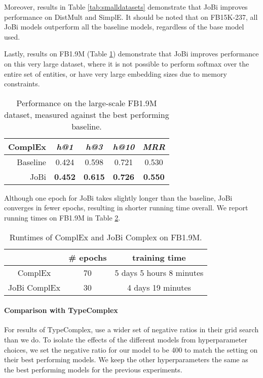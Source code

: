 \documentclass[11pt,a4paper, dvipsnames]{article}
\begin{document}
Moreover, results in Table \ref{tab:smalldatasets} demonstrate that JoBi improves performance on DistMult and SimplE. It should be noted that on FB15K-237, all JoBi models outperform all the baseline models, regardless of the base model used.

Lastly, results on FB1.9M (Table \ref{tab:fb2p6m}) demonstrate that JoBi improves performance on this very large dataset, where it is not possible to perform softmax over the entire set of entities, or have very large embedding sizes due to memory constraints. 

\begin{table}[t!] \centering
    \small
    \begin{tabular}{r | c c c c  }
       \textbf{ComplEx} & \textit{h@1} & \textit{h@3} & \textit{h@10} & \textit{MRR} \\
         \hline 
         Baseline & 0.424 & 0.598 & 0.721 & 0.530 \\
         JoBi  & \textbf{0.452} & \textbf{0.615} & \textbf{0.726} & \textbf{0.550}
        
         
    \end{tabular}
    \caption{Performance on the large-scale FB1.9M dataset, measured against the best performing baseline.}
    \label{tab:fb2p6m}
\end{table}

Although one epoch for JoBi takes slightly longer than the baseline, JoBi converges in fewer epochs, resulting in shorter running time overall. We report running times on FB1.9M in Table \ref{tab:runtime}.

\begin{table}[t!]
    \centering
    \small
    \begin{tabular}{c | c | c}
    & \textbf{\# epochs} & \textbf{training time} \\
    \hline
    ComplEx & 70 & 5 days 5 hours 8 minutes \\
    JoBi ComplEx & 30 & 4 days 19 minutes 
    \end{tabular}
    \caption{Runtimes of ComplEx and JoBi Complex on FB1.9M.}
    \label{tab:runtime}
\end{table}

\paragraph{Comparison with TypeComplex} \label{sec:typecomplex}
For results of TypeComplex, \citet{Jain2018Type-SensitiveSupervision} use a wider set of negative ratios in their grid search than we do. To isolate the effects of the different models from hyperparameter choices, we set the negative ratio for our model to be 400 to match the setting on their best performing models. We keep the other hyperparameters the same as the best performing models for the previous experiments. 
\end{document}
